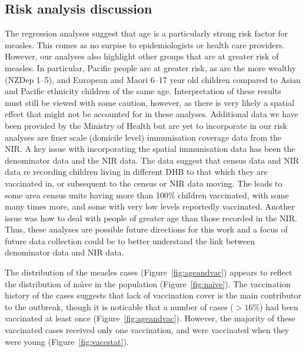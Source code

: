 \documentclass{article}
\begin{document}
\begin{itemize}
\subsection{Risk analysis discussion}

The regression analyses suggest that age is a particularly strong risk factor for measles. This comes as no surpise to epidemiologists or health care providers. However, our analyses also highlight other groups that are at greater risk of measles. In particular, Pacific people are at greater risk, as are the more wealthy (NZDep 1--5), and European and Maori 6--17 year old children compared to Asian and Pacific ethnicity children of the same age. Interpretation of these results must still be viewed with some caution, however, as there is very likely a spatial effect that might not be accounted for in these analyses. Additional data we have been provided by the Ministry of Health but are yet to incorporate in our risk analyses are finer scale (domicile level) immunisation coverage data from the NIR. A key issue with incorporating the spatial immunisation data has been the denominator data and the NIR data. The data suggest that census data and NIR data re recording children living in different DHB to that which they are vaccinated in, or subsequent to the census or NIR data moving. The leads to some area census units having more than 100\% children vaccinated, with some many times more, and some with very low levels reportedly vaccinated. Another issue was how to deal with people of greater age than those recorded in the NIR. Thus, these analyses are possible future directions for this work and a focus of future data collection could be to better understand the link between denominator data and NIR data. 

The distribution of the measles cases (Figure~\ref{fig:ageandvac}) appears to reflect the distribution of na\"{\i}ve in the population (Figure~\ref{fig:naive}). The vaccination history of the cases suggests that lack of vaccination cover is the main contributor to the outbreak, though it is noticable that a number of cases ($>16\%$) had been vaccinated at least once (Figure~\ref{fig:ageandvac}). However, the majority of these vaccinated cases received only one vaccination, and were vaccinated when they were young (Figure~\ref{fig:vaccstat}). 


\end{itemize}
\end{document}
